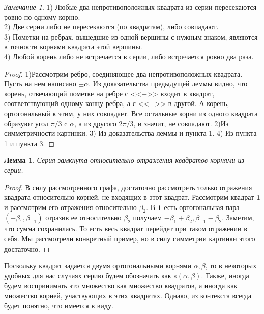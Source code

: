 \documentclass[a4paper,12pt]{amsart}
\theoremstyle{plain}
\newtheorem{lemma}{Лемма}
\theoremstyle{remark}
\newtheorem{remark}{Замечание}
\theoremstyle{definition}
\begin{document}
\begin{remark}
    1) Любые два непротивоположных квадрата из серии пересекаются ровно по одному корню.\\
    2) Две серии либо не пересекаются (по квадратам), либо совпадают.\\
    3) Пометки на ребрах, вышедшие из одной вершины с нужным знаком, являются в точности корнями квадрата этой вершины.\\
    4) Любой корень либо не встречается в серии, либо встречается ровно два раза.\\
\end{remark}
\begin{proof}
1)Рассмотрим ребро, соединяющее два непротивоположных квадрата. Пусть на нем написано $\pm\alpha$. Из доказательства предыдущей леммы видно, что корень, отвечающий пометке на ребре с <<$+$>> входит в квадрат, соответствующий одному концу ребра, а с <<$-$>> в другой. А корень, ортогональный к этим, у них совпадает. Все остальные корни из одного квадрата образуют угол $\pi/3$ c $\alpha$, а из другого $2\pi/3$, и значит, не совпадают. 2)Из симметричности картинки. 3) Из доказательства леммы и пункта 1. 4) Из пункта 1 и пункта 3.
\end{proof}


\begin{lemma}
Серия замкнута относительно отражения квадратов корнями из серии.
\end{lemma}
\begin{proof}
В силу рассмотренного графа, достаточно рассмотреть только отражения квадрата относительно корней, не входящих в этот квадрат. Рассмотрим квадрат $\mathbf{1}$ и рассмотрим его отражения относительно $\beta_2$. В $\mathbf{1}$ есть ортогональная пара $(-\beta_1,\beta_{-1})$ отразив ее относительно $\beta_2$ получаем $-\beta_1+\beta_2,\beta_{-1}-\beta_2$. Заметим, что сумма сохранилась.  То есть весь квадрат перейдет при таком отражении в себя. Мы рассмотрели конкретный пример, но в силу симметрии картинки этого достаточно.

\end{proof}


Поскольку квадрат задается двумя ортогональными корнями $\alpha, \beta$, то в некоторых удобных для нас случаях серию будем обозначать как  $s(\alpha,\beta)$. Также, иногда будем воспринимать это множество как множество квадратов, а иногда как множество корней, участвующих в этих квадратах. Однако, из контекста всегда будет понятно, что имеется в виду.
\\
\end{document}

